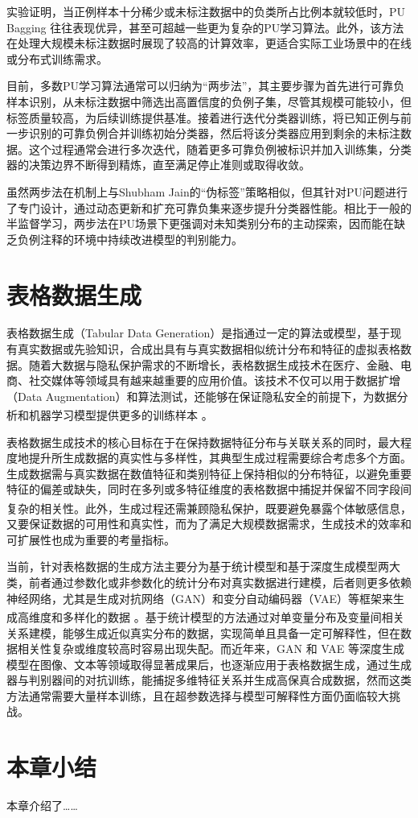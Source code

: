 实验证明，当正例样本十分稀少或未标注数据中的负类所占比例本就较低时，PU Bagging 往往表现优异，甚至可超越一些更为复杂的PU学习算法。此外，该方法在处理大规模未标注数据时展现了较高的计算效率，更适合实际工业场景中的在线或分布式训练需求。

目前，多数PU学习算法通常可以归纳为“两步法”，其主要步骤为首先进行可靠负样本识别，从未标注数据中筛选出高置信度的负例子集，尽管其规模可能较小，但标签质量较高，为后续训练提供基准。接着进行迭代分类器训练，将已知正例与前一步识别的可靠负例合并训练初始分类器，然后将该分类器应用到剩余的未标注数据。这个过程通常会进行多次迭代，随着更多可靠负例被标识并加入训练集，分类器的决策边界不断得到精炼，直至满足停止准则或取得收敛。

虽然两步法在机制上与Shubham Jain的“伪标签”策略相似，但其针对PU问题进行了专门设计，通过动态更新和扩充可靠负集来逐步提升分类器性能。相比于一般的半监督学习，两步法在PU场景下更强调对未知类别分布的主动探索，因而能在缺乏负例注释的环境中持续改进模型的判别能力。

\section{表格数据生成}


表格数据生成（Tabular Data Generation）是指通过一定的算法或模型，基于现有真实数据或先验知识，合成出具有与真实数据相似统计分布和特征的虚拟表格数据。随着大数据与隐私保护需求的不断增长，表格数据生成技术在医疗、金融、电商、社交媒体等领域具有越来越重要的应用价值。该技术不仅可以用于数据扩增（Data Augmentation）和算法测试，还能够在保证隐私安全的前提下，为数据分析和机器学习模型提供更多的训练样本 \textsuperscript{\cite{li2021survey}}。

表格数据生成技术的核心目标在于在保持数据特征分布与关联关系的同时，最大程度地提升所生成数据的真实性与多样性，其典型生成过程需要综合考虑多个方面。生成数据需与真实数据在数值特征和类别特征上保持相似的分布特征，以避免重要特征的偏差或缺失，同时在多列或多特征维度的表格数据中捕捉并保留不同字段间复杂的相关性\textsuperscript{\cite{zhang2020tab}}。此外，生成过程还需兼顾隐私保护，既要避免暴露个体敏感信息，又要保证数据的可用性和真实性，而为了满足大规模数据需求，生成技术的效率和可扩展性也成为重要的考量指标。


当前，针对表格数据的生成方法主要分为基于统计模型和基于深度生成模型两大类，前者通过参数化或非参数化的统计分布对真实数据进行建模，后者则更多依赖神经网络，尤其是生成对抗网络（GAN）和变分自动编码器（VAE）等框架来生成高维度和多样化的数据 \textsuperscript{\cite{brown2019differential}}。基于统计模型的方法通过对单变量分布及变量间相关关系建模，能够生成近似真实分布的数据，实现简单且具备一定可解释性，但在数据相关性复杂或维度较高时容易出现失配。而近年来，GAN 和 VAE 等深度生成模型在图像、文本等领域取得显著成果后，也逐渐应用于表格数据生成，通过生成器与判别器间的对抗训练，能捕捉多维特征关系并生成高保真合成数据，然而这类方法通常需要大量样本训练，且在超参数选择与模型可解释性方面仍面临较大挑战。




\section{本章小结}
本章介绍了……






